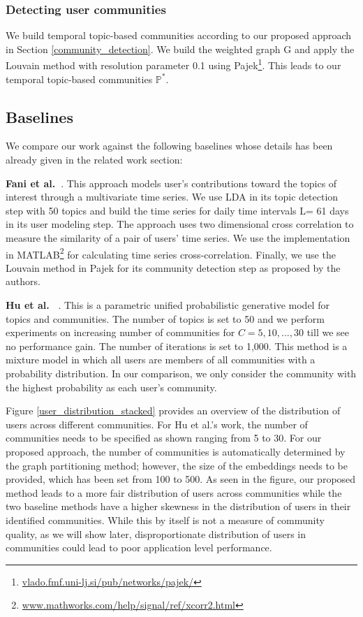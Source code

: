 \documentclass[sigconf]{acmart}
\begin{document}
\subsubsection{Detecting user communities}
We build temporal topic-based communities according to our proposed approach in Section \ref{community_detection}. We build the weighted graph G and apply the Louvain method with resolution parameter 0.1 using Pajek\footnote{\href{http://vlado.fmf.uni-lj.si/pub/networks/pajek/}{vlado.fmf.uni-lj.si/pub/networks/pajek/}}. This leads to our temporal topic-based communities $\mathbb{P}^*$. 

\subsection{Baselines}
We compare our work against the following baselines whose details has been already given in the related work section: 

\textbf{Fani et al.~\cite{DBLP:journals/ci/FaniBZZD17}}. This approach models user's contributions toward the topics of interest through a multivariate time series. We use LDA in its topic detection step with 50 topics and build the time series for daily time intervals L= 61 days in its user modeling step. The approach uses two dimensional cross correlation to measure the similarity of a pair of users' time series. We use the implementation in MATLAB\footnote{\href{https://www.mathworks.com/help/signal/ref/xcorr2.html}{www.mathworks.com/help/signal/ref/xcorr2.html}} for calculating time series cross-correlation. Finally, we use the Louvain method in Pajek for its community detection step as proposed by the authors. 

\textbf{Hu et al.~\cite{DBLP:conf/aaai/HuYC14}} . This is a parametric unified probabilistic generative model for topics and communities. The number of topics is set to 50 and we perform experiments on increasing number of communities for $C={5,10,...,30}$ till we see no performance gain. The number of iterations is set to 1,000. This method is a mixture model in which all users are members of all communities with a probability distribution. In our comparison, we only consider the community with the highest probability as each user's community.


Figure \ref{user_distribution_stacked} provides an overview of the distribution of users across different communities. For Hu et al.'s work, the number of communities needs to be specified as shown ranging from 5 to 30. For our proposed approach, the number of communities is automatically determined by the graph partitioning method; however, the size of the embeddings needs to be provided, which has been set from 100 to 500. As seen in the figure, our proposed method leads to a more fair distribution of users across communities while the two baseline methods have a higher skewness in the distribution of users in their identified communities. While this by itself is not a measure of community quality, as we will show later, disproportionate distribution of users in communities could lead to poor application level performance.
\end{document}
